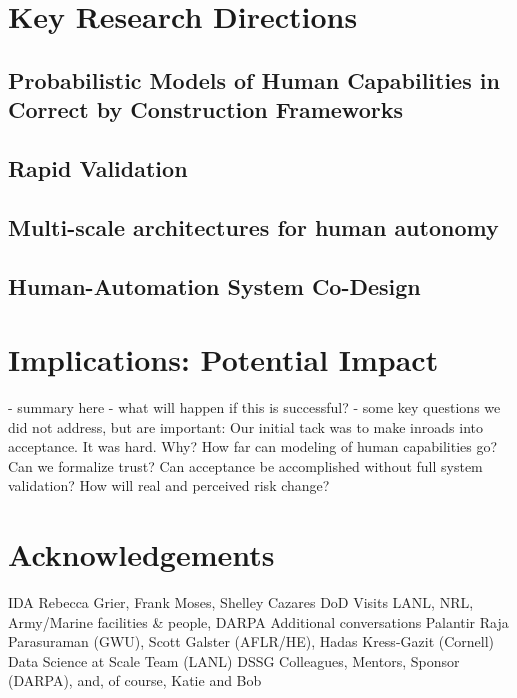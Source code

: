 \documentclass[11pt]{dssg}
\begin{document}
\section*{Key Research Directions}

\subsection*{Probabilistic Models of Human Capabilities in Correct by Construction Frameworks}

\subsection*{Rapid Validation}

\subsection*{Multi-scale architectures for human autonomy}

\subsection*{Human-Automation System Co-Design}

\section*{Implications: Potential Impact}

- summary here
- what will happen if this is successful?
- some key questions we did not address, but are important:
Our initial tack was to make inroads into acceptance.  It was hard.  Why?
How far can modeling of human capabilities go? 
Can we formalize trust?
Can acceptance be accomplished without full system validation?
How will real and perceived risk change?



\section*{Acknowledgements}
IDA
Rebecca Grier, Frank Moses, Shelley Cazares
DoD Visits
LANL, NRL, Army/Marine facilities \& people, DARPA
Additional conversations
Palantir
Raja Parasuraman (GWU), Scott Galster (AFLR/HE), Hadas Kress-Gazit (Cornell)
Data Science at Scale Team (LANL)
DSSG Colleagues, Mentors, Sponsor (DARPA), and, of course, Katie and Bob




\newpage


\normalsize
\end{document}

